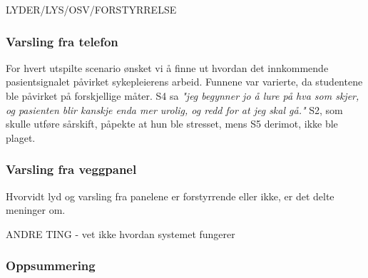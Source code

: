 LYDER/LYS/OSV/FORSTYRRELSE

\subsubsection{Varsling fra telefon}
For hvert utspilte scenario ønsket vi å finne ut hvordan det innkommende pasientsignalet påvirket sykepleierens arbeid. Funnene var varierte, da studentene ble påvirket på forskjellige måter. S4 sa \emph{"jeg begynner jo å lure på hva som skjer, og pasienten blir kanskje enda mer urolig, og redd for at jeg skal gå."} S2, som skulle utføre sårskift, påpekte at hun ble stresset, mens S5 derimot, ikke ble plaget.

\subsubsection{Varsling fra veggpanel}
Hvorvidt lyd og varsling fra panelene er forstyrrende eller ikke, er det delte meninger om.  

ANDRE TING
- vet ikke hvordan systemet fungerer

\subsubsection{Oppsummering}